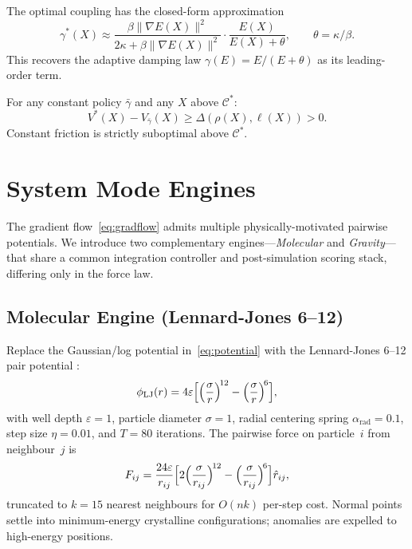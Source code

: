\documentclass[final]{siamltex}
\newcommand{\norm}[1]{\lVert #1 \rVert}
\providecommand{\grad}{\nabla}
\newcommand{\Cman}{\mathcal{C}^*}
\begin{document}
\begin{theorem}\label{thm:optimal}
The optimal coupling has the closed-form approximation
\begin{equation}\label{eq:gammastar}
  \gamma^*(X) \approx
  \frac{\beta\norm{\grad E(X)}^2}{2\kappa+\beta\norm{\grad E(X)}^2}
  \cdot\frac{E(X)}{E(X)+\theta},\qquad
  \theta=\kappa/\beta.
\end{equation}
This recovers the adaptive damping law $\gamma(E)=E/(E+\theta)$ as
its leading-order term.
\end{theorem}

\begin{theorem}\label{thm:necessity}
For any constant policy $\bar{\gamma}$ and any $X$ above $\Cman$:
\[
  V^*(X)-V_{\bar{\gamma}}(X)\ge\Delta(\rho(X),\ell(X))>0.
\]
Constant friction is strictly suboptimal above $\Cman$.
\end{theorem}


\section{System Mode Engines}\label{sec:engines}

The gradient flow~\eqref{eq:gradflow} admits multiple
physically-motivated pairwise potentials.  We introduce two
complementary engines---\emph{Molecular} and \emph{Gravity}---that
share a common integration controller and post-simulation scoring
stack, differing only in the force law.

\subsection{Molecular Engine (Lennard-Jones 6--12)}\label{sec:molecular}

Replace the Gaussian/log potential in~\eqref{eq:potential} with the
Lennard-Jones 6--12 pair potential \cite{jones1924lj}:
\begin{equation}\label{eq:lj}
  \phi_{\mathrm{LJ}}(r) = 4\varepsilon\Bigl[
  \Bigl(\frac{\sigma}{r}\Bigr)^{\!12}
  - \Bigl(\frac{\sigma}{r}\Bigr)^{\!6}\Bigr],
\end{equation}
with well depth $\varepsilon=1$, particle diameter $\sigma=1$,
radial centering spring $\alpha_{\mathrm{rad}}=0.1$, step size
$\eta=0.01$, and $T=80$ iterations.  The pairwise force on
particle~$i$ from neighbour~$j$ is
\begin{equation}\label{eq:ljforce}
  F_{ij} = \frac{24\varepsilon}{r_{ij}}\Bigl[
  2\Bigl(\frac{\sigma}{r_{ij}}\Bigr)^{\!12}
  - \Bigl(\frac{\sigma}{r_{ij}}\Bigr)^{\!6}\Bigr]\hat{r}_{ij},
\end{equation}
truncated to $k=15$ nearest neighbours for $O(nk)$ per-step cost.
Normal points settle into minimum-energy crystalline configurations;
anomalies are expelled to high-energy positions.
\end{document}

